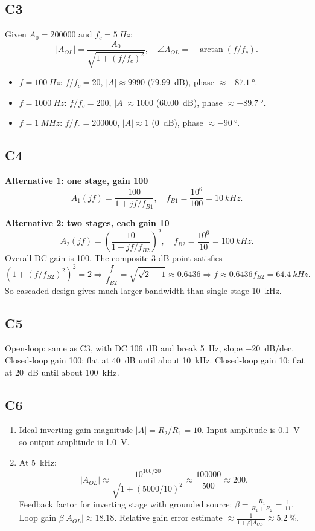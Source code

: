 \documentclass[12pt,a4paper]{article}
\begin{document}
\subsection{C3}
Given $A_0=200000$ and $f_c=\SI{5}{Hz}$:
\[
|A_{OL}|=\frac{A_0}{\sqrt{1+(f/f_c)^2}},\quad \angle A_{OL}=-\arctan(f/f_c).
\]
\begin{itemize}
\item $f=\SI{100}{Hz}$: $f/f_c=20$, $|A|\approx 9990$ (\SI{79.99}{dB}), phase $\approx \SI{-87.1}{\degree}$.
\item $f=\SI{1000}{Hz}$: $f/f_c=200$, $|A|\approx1000$ (\SI{60.00}{dB}), phase $\approx \SI{-89.7}{\degree}$.
\item $f=\SI{1}{MHz}$: $f/f_c=200000$, $|A|\approx1$ (\SI{0}{dB}), phase $\approx \SI{-90}{\degree}$.
\end{itemize}

\subsection{C4}
\textbf{Alternative 1: one stage, gain 100}
\[
A_1(jf)=\frac{100}{1+jf/f_{B1}},\quad f_{B1}=\frac{10^6}{100}=\SI{10}{kHz}.
\]

\textbf{Alternative 2: two stages, each gain 10}
\[
A_2(jf)=\left(\frac{10}{1+jf/f_{B2}}\right)^2,\quad f_{B2}=\frac{10^6}{10}=\SI{100}{kHz}.
\]
Overall DC gain is 100. The composite 3-dB point satisfies
\[
\left(1+(f/f_{B2})^2\right)^2=2 \Rightarrow \frac{f}{f_{B2}}=\sqrt{\sqrt{2}-1}\approx0.6436
\Rightarrow f\approx0.6436f_{B2}=\SI{64.4}{kHz}.
\]
So cascaded design gives much larger bandwidth than single-stage \SI{10}{kHz}.

\subsection{C5}
Open-loop: same as C3, with DC \SI{106}{dB} and break \SI{5}{Hz}, slope \SI{-20}{dB/dec}.
Closed-loop gain 100: flat at \SI{40}{dB} until about \SI{10}{kHz}.
Closed-loop gain 10: flat at \SI{20}{dB} until about \SI{100}{kHz}.

\subsection{C6}
\begin{enumerate}
\item Ideal inverting gain magnitude $|A|=R_2/R_1=10$.
Input amplitude is \SI{0.1}{V} so output amplitude is \SI{1.0}{V}.
\item At \SI{5}{kHz}: 
\[
|A_{OL}|\approx \frac{10^{100/20}}{\sqrt{1+(5000/10)^2}}\approx\frac{100000}{500}\approx200.
\]
Feedback factor for inverting stage with grounded source: 
$\beta=\frac{R_1}{R_1+R_2}=\frac{1}{11}$.
Loop gain $\beta|A_{OL}|\approx18.18$.
Relative gain error estimate $\approx\frac{1}{1+\beta|A_{OL}|}\approx\SI{5.2}{\percent}$.
\end{enumerate}
\end{document}
